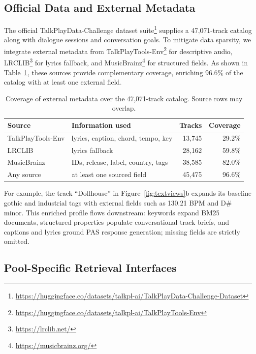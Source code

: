 \documentclass[sigconf]{acmart}
\begin{document}
\subsection{Official Data and External Metadata}

The official TalkPlayData-Challenge dataset suite\footnote{\url{https://huggingface.co/datasets/talkpl-ai/TalkPlayData-Challenge-Dataset}} supplies a 47,071-track catalog along with dialogue sessions and conversation goals. To mitigate data sparsity, we integrate external metadata from TalkPlayTools\allowbreak-Env\footnote{\url{https://huggingface.co/datasets/talkpl-ai/TalkPlayTools-Env}} for descriptive audio, LRCLIB\footnote{\url{https://lrclib.net/}} for lyrics fallback, and MusicBrainz\footnote{\url{https://musicbrainz.org/}} for structured fields. As shown in Table~\ref{tab:metadata}, these sources provide complementary coverage, enriching 96.6\% of the catalog with at least one external field.

\begin{table}[h]
  \caption{Coverage of external metadata over the 47,071-track catalog.
  Source rows may overlap.}
  \label{tab:metadata}
  \centering
  \scriptsize
  \renewcommand{\arraystretch}{0.9}
  \setlength{\tabcolsep}{4pt}
  \begin{tabular}{@{}lp{3.3cm}rr@{}}
    \toprule
    Source & Information used & Tracks & Coverage \\
    \midrule
    TalkPlayTools-Env & lyrics, caption, chord, tempo, key & 13,745 & 29.2\% \\
    LRCLIB & lyrics fallback & 28,162 & 59.8\% \\
    MusicBrainz & IDs, release, label, country, tags & 38,585 & 82.0\% \\
    Any source & at least one sourced field & 45,475 & 96.6\% \\
    \bottomrule
  \end{tabular}
  \vspace{-2mm}
\end{table}

For example, the track ``Dollhouse'' in Figure~\ref{fig:textviews}b expands its baseline gothic and industrial tags with external fields such as 130.21 BPM and D\# minor. This enriched profile flows downstream: keywords expand BM25 documents, structured properties populate conversational track briefs, and captions and lyrics ground PAS response generation; missing fields are strictly omitted.

\subsection{Pool-Specific Retrieval Interfaces}
\end{document}
